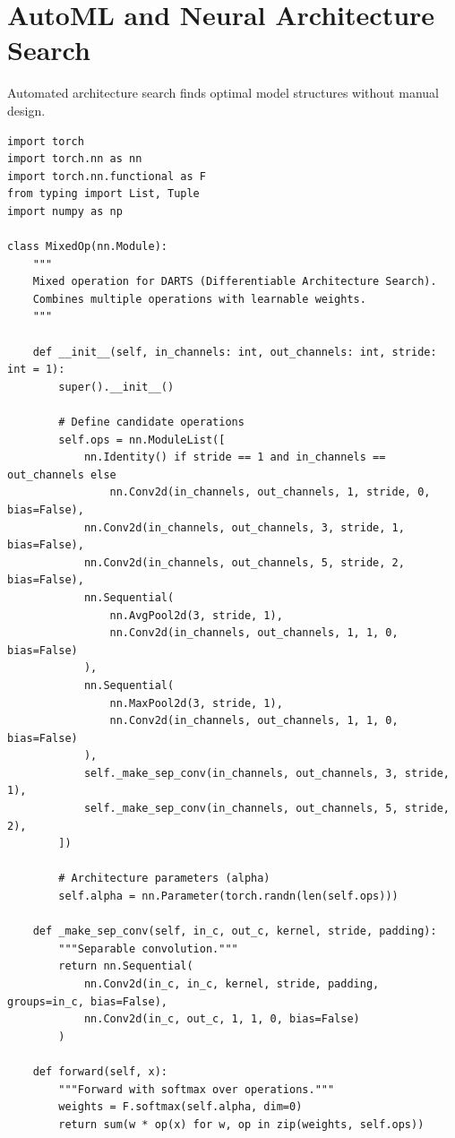 \section{AutoML and Neural Architecture Search}

Automated architecture search finds optimal model structures without manual design.

\begin{lstlisting}[style=python, caption=Neural Architecture Search with DARTS]
import torch
import torch.nn as nn
import torch.nn.functional as F
from typing import List, Tuple
import numpy as np

class MixedOp(nn.Module):
    """
    Mixed operation for DARTS (Differentiable Architecture Search).
    Combines multiple operations with learnable weights.
    """

    def __init__(self, in_channels: int, out_channels: int, stride: int = 1):
        super().__init__()

        # Define candidate operations
        self.ops = nn.ModuleList([
            nn.Identity() if stride == 1 and in_channels == out_channels else
                nn.Conv2d(in_channels, out_channels, 1, stride, 0, bias=False),
            nn.Conv2d(in_channels, out_channels, 3, stride, 1, bias=False),
            nn.Conv2d(in_channels, out_channels, 5, stride, 2, bias=False),
            nn.Sequential(
                nn.AvgPool2d(3, stride, 1),
                nn.Conv2d(in_channels, out_channels, 1, 1, 0, bias=False)
            ),
            nn.Sequential(
                nn.MaxPool2d(3, stride, 1),
                nn.Conv2d(in_channels, out_channels, 1, 1, 0, bias=False)
            ),
            self._make_sep_conv(in_channels, out_channels, 3, stride, 1),
            self._make_sep_conv(in_channels, out_channels, 5, stride, 2),
        ])

        # Architecture parameters (alpha)
        self.alpha = nn.Parameter(torch.randn(len(self.ops)))

    def _make_sep_conv(self, in_c, out_c, kernel, stride, padding):
        """Separable convolution."""
        return nn.Sequential(
            nn.Conv2d(in_c, in_c, kernel, stride, padding, groups=in_c, bias=False),
            nn.Conv2d(in_c, out_c, 1, 1, 0, bias=False)
        )

    def forward(self, x):
        """Forward with softmax over operations."""
        weights = F.softmax(self.alpha, dim=0)
        return sum(w * op(x) for w, op in zip(weights, self.ops))


\end{lstlisting}
